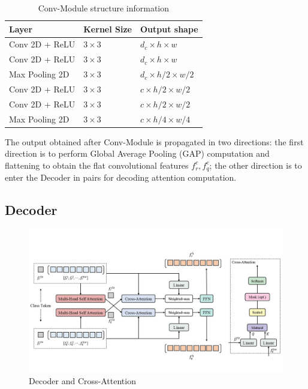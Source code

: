 \documentclass{article}
\begin{document}
\begin{table}[htbp]
	\caption{Conv-Module structure information}
	\begin{center}
		\begin{tabu} to 0.8\textwidth{X[2,c]|X[2,c]|X[2,c]}
			\hline
			Layer          & Kernel Size & Output shape              \\
			\hline
			Conv 2D + ReLU & $3\times 3$ & $d_c\times h\times w$     \\
			Conv 2D + ReLU & $3\times 3$ & $d_c\times h\times w$     \\
			Max Pooling 2D & $3\times 3$ & $d_c\times h/2\times w/2$ \\
			Conv 2D + ReLU & $3\times 3$ & $c\times h/2\times w/2$   \\
			Conv 2D + ReLU & $3\times 3$ & $c\times h/2\times w/2$   \\
			Max Pooling 2D & $3\times 3$ & $c\times h/4\times w/4$   \\
			\hline
		\end{tabu}
	\end{center}
	\label{tab:t1}
\end{table}

The output obtained after Conv-Module is propagated in two directions: the first direction is to perform Global Average Pooling (GAP) computation and flattening to obtain the flat convolutional features $f_r^c,f_q^c$; the other direction is to enter the Decoder in pairs for decoding attention computation.

\subsection{Decoder}

\begin{figure}[htbp]
	\centering
	\includegraphics[scale=0.45]{figure/p5.jpg}
	\caption{Decoder and Cross-Attention}\label{fig:p5}
\end{figure}
\end{document}
